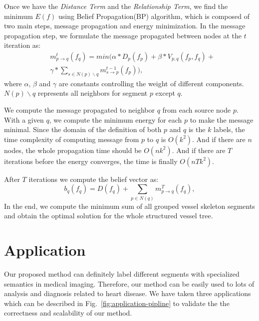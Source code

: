 \documentclass[journal]{IEEEtran}
\begin{document}
Once we have the \textit{Distance Term} and the \textit{Relationship Term}, we find the minimum $E(f)$ using Belief Propagation(BP) algorithm, which is composed of two main steps, message propagation and energy minimization. In the message propagation step, we formulate the message propagated between nodes at the $t$ iteration as:
\begin{equation}
\begin{split}
&m_{p \to q}^{t}(f_{q}) = min(\alpha*D_p(f_{p}) + \beta*V_{p,q}(f_{p},f_{q}) + \\
&\gamma*\sum_{s \in N(p)\backslash q}{m_{s \to p}^{t-1}(f_{p})}),
\end{split}
\end{equation}
where $\alpha$, $\beta$ and $\gamma$ are constants controlling the weight of different components. $N(p)\backslash q$ represents all neighbors for segment $p$ except $q$.

We compute the message propagated to neighbor $q$ from each source node $p$. With a given $q$, we compute the minimum energy for each $p$ to make the message minimal. Since the domain of the definition of both $p$ and $q$ is the $k$ labels, the time complexity of computing message from $p$ to $q$ is $O(k^2)$. And if there are $n$ nodes, the whole propagation time should be $O(nk^2)$. And if there are
$T$ iterations before the energy converges, the time is finally $O(nTk^2)$.

After $T$ iterations we compute the belief vector as:
\begin{equation}
b_{q}(f_{q}) = D(f_{q}) + \sum_{p \in N(q)}{m_{p \to q}^{T}(f_{q})},
\end{equation}
In the end, we compute the minimum sum of all grouped vessel skeleton segments and obtain the optimal solution for the whole structured vessel tree.


\section{Application}
Our proposed method can definitely label different segments with specialized semantics in medical imaging. Therefore, our method can be easily used to lots of analysis and diagnosis related to heart disease. We have taken three applications which can be described in Fig.~\ref{fig:application-pipline} to validate the the correctness and scalability of our method.
\end{document}
